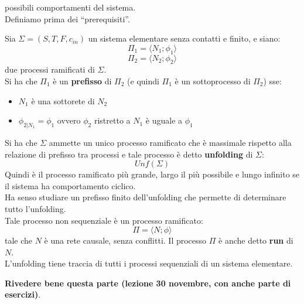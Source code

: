 \documentclass[a4paper,12pt, oneside]{book}
\begin{document}
possibili comportamenti del sistema.\\
Definiamo prima dei ``prerequisiti''.
\begin{definizione}
  Sia $\Sigma=(S,T,F,c_{in})$ un sistema elementare senza contatti e finito, e
  siano:
  \[\Pi_1=\langle N_1;\phi_1\rangle\]
  \[\Pi_2=\langle N_2;\phi_2\rangle\]
  due processi ramificati di $\Sigma$.\\
  Si ha che $\Pi_1$ è un \textbf{prefisso} di $\Pi_2$ (e quindi $\Pi_1$ è un
  sottoprocesso di $\Pi_2$) sse:
  \begin{itemize}
    \item $N_1$ è una sottorete di $N_2$
    \item $\phi_{2|N_1}=\phi_1$ ovvero $\phi_2$ ristretto a $N_1$  è uguale a
    $\phi_1$ 
  \end{itemize}
  Si ha che $\Sigma$ ammette un unico processo ramificato che è massimale
  rispetto alla relazione di prefisso tra processi e tale processo è detto
  \textbf{unfolding} di $\Sigma$:
  \[Unf(\Sigma)\]
  Quindi è il processo ramificato più grande, largo il più possibile e lungo
  infinito se il sistema ha comportamento ciclico.\\
  Ha senso studiare un prefisso finito dell'unfolding che permette di
  determinare tutto l'unfolding.\\
  Tale processo non sequenziale è un processo ramificato:
  \[\Pi=\langle N;\phi\rangle\]
  tale che $N$ è una rete causale, senza conflitti. Il processo $\Pi$ è anche
  detto \textbf{run} di $N$.\\
  L'unfolding tiene traccia di tutti i processi sequenziali di un sistema
  elementare. 
\end{definizione}
\textbf{Rivedere bene questa parte (lezione 30 novembre, con anche parte di
  esercizi)}.\\
\end{document}
